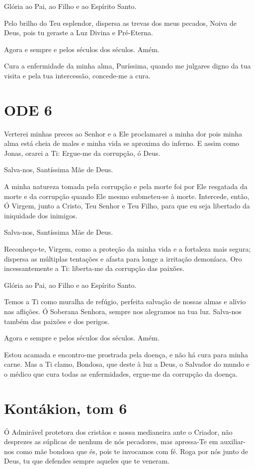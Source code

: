\documentclass{subfiles}
\begin{document}
Glória ao Pai, ao Filho e ao Espírito Santo.

Pelo brilho do Teu esplendor, dispersa as trevas dos meus pecados,
Noiva de Deus, pois tu geraste a Luz Divina e Pré-Eterna.

Agora e sempre e pelos séculos dos séculos. Amém.

Cura a enfermidade da minha alma, Puríssima, quando me julgares digno da tua
visita e pela tua intercessão, concede-me a cura.

\section*{ODE 6}

\eirmos{}Verterei minhas preces ao Senhor e a Ele proclamarei a minha
dor pois minha alma está cheia de males e minha vida se aproxima do inferno.
E assim como Jonas, orarei a Ti: Ergue-me da corrupção, ó Deus.

Salva-nos, Santíssima Mãe de Deus.

A minha natureza tomada pela corrupção e pela morte foi por Ele
resgatada da morte e da corrupção quando Ele mesmo submeteu-se à morte.
Intercede, então, Ó Virgem, junto a Cristo, Teu Senhor e Teu Filho, para que eu
seja libertado da iniquidade dos inimigos.

Salva-nos, Santíssima Mãe de Deus.

Reconheço-te, Virgem, como a proteção da minha vida e a fortaleza
mais segura; dispersa as múltiplas tentações e afasta para longe a irritação
demoníaca. Oro incessantemente a Ti: liberta-me da corrupção das paixões.

Glória ao Pai, ao Filho e ao Espírito Santo.

Temos a Ti como muralha de refúgio, perfeita salvação de nossas
almas e alívio nas aflições. Ó Soberana Senhora, sempre nos alegramos na tua
luz. Salva-nos também das paixões e dos perigos.

Agora e sempre e pelos séculos dos séculos. Amém.

Estou acamada e encontro-me prostrada pela doença, e não há cura
para minha carne. Mas a Ti clamo, Bondosa, que deste à luz a Deus, o Salvador
do mundo e o médico que cura todas as enfermidades, ergue-me da corrupção
da doença.

\section*{Kontákion, tom 6}

Ó Admirável protetora dos cristãos e nossa medianeira ante o Criador,
não desprezes as súplicas de nenhum de nós pecadores, mas apressa-Te em
auxiliar-nos como mãe bondosa que és, pois te invocamos com fé. Roga por
nós junto de Deus, tu que defendes sempre aqueles que te veneram.
\end{document}
